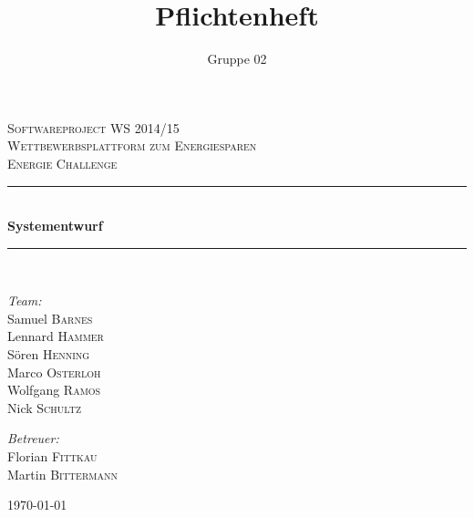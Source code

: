 \documentclass[10pt,a4paper]{article}
\author{Gruppe 02}
\title{Pflichtenheft}
\begin{document}
\begin{titlepage}

\begin{center}



\textsc{\LARGE Softwareproject WS 2014/15}\\[1.5cm]

\textsc{\Large Wettbewerbsplattform zum Energiesparen\\[1cm]Energie Challenge}\\[0.5cm]


\newcommand{\HRule}{\rule{\linewidth}{0.5mm}}
\HRule \\[0.4cm]
{ \huge \bfseries Systementwurf}\\[0.4cm]

\HRule \\[1.5cm]

\begin{minipage}{0.4\textwidth}
\begin{flushleft} \large
\emph{Team:}\\
Samuel \textsc{Barnes}\\
Lennard \textsc{Hammer}\\
S\"oren \textsc{Henning}\\
Marco \textsc{Osterloh}\\
Wolfgang \textsc{Ramos}\\
Nick \textsc{Schultz}
\end{flushleft}
\end{minipage}
\hfill
\begin{minipage}{0.4\textwidth}
\begin{flushright} \large
\emph{Betreuer:} \\
Florian \textsc{Fittkau}\\
Martin \textsc{Bittermann}
\end{flushright}
\end{minipage}

\vfill

{\large \today}

\end{center}

\end{titlepage}
\newpage

\tableofcontents
\newpage






\end{document}

